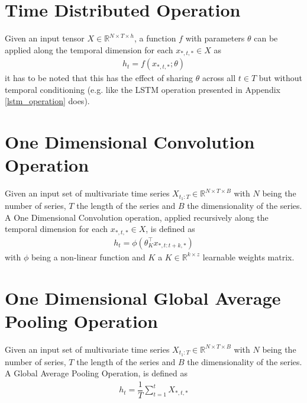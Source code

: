 \section{Time Distributed Operation}
Given an input tensor $X \in \mathbb{R}^{N \times T \times h}$, a function $f$ with parameters $\theta$ can be applied along the temporal dimension for each $x_{*,t,*} \in X$ as
\begin{gather}
    \label{time_distributed}
    h_t = f(x_{*,t,*}; \theta)
\end{gather}
it has to be noted that this has the effect of sharing $\theta$ across all $t \in T$ but without temporal conditioning (e.g. like the LSTM operation presented in Appendix \ref{lstm_operation} does).

\section{One Dimensional Convolution Operation}
Given an input set of multivariate time series $X_{t_1:T} \in \mathbb{R}^{N \times T \times B}$ with $N$ being the number of series, $T$ the length of the series and $B$ the dimensionality of the series. A One Dimensional Convolution operation, applied recursively along the temporal dimension for each $x_{*,t,*} \in X$, is defined as
\begin{gather}
    \label{1d_conv}
    h_t = \phi(\theta_{K}^\top x_{*,t : t+k,*})
\end{gather}
with $\phi$ being a non-linear function and $K$ a $K \in \mathbb{R}^{k \times z}$ learnable weights matrix.

\section{One Dimensional Global Average Pooling Operation}
Given an input set of multivariate time series $X_{t_1:T} \in \mathbb{R}^{N \times T \times B}$ with $N$ being the number of series, $T$ the length of the series and $B$ the dimensionality of the series. A Global Average Pooling Operation, is defined as
\begin{gather}
    \label{1d_pool}
    h_t = \dfrac{1}{T} \sum_{t=1}^{t}X_{*,t,*}
\end{gather}

